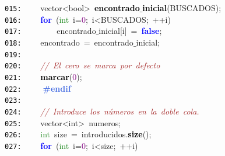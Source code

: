 \documentclass[a4paper,10pt]{scrartcl}
\begin{document}
{   \mbox{}\texttt{\textcolor{Black}{015:}} \ \ \ \ \textcolor{TealBlue}{vector\textless{}bool\textgreater{}}\ \textbf{\textcolor{Black}{encontrado$\_$inicial}}\textcolor{BrickRed}{(}BUSCADOS\textcolor{BrickRed}{);} \\
   \mbox{}\texttt{\textcolor{Black}{016:}} \ \ \ \ \textbf{\textcolor{Blue}{for}}\ \textcolor{BrickRed}{(}\textcolor{ForestGreen}{int}\ i\textcolor{BrickRed}{=}\textcolor{Purple}{0}\textcolor{BrickRed}{;}\ i\textcolor{BrickRed}{\textless{}}BUSCADOS\textcolor{BrickRed}{;}\ \textcolor{BrickRed}{++}i\textcolor{BrickRed}{)} \\
   \mbox{}\texttt{\textcolor{Black}{017:}} \ \ \ \ \ \ \ \ encontrado$\_$inicial\textcolor{BrickRed}{[}i\textcolor{BrickRed}{]}\ \textcolor{BrickRed}{=}\ \textbf{\textcolor{Blue}{false}}\textcolor{BrickRed}{;} \\
   \mbox{}\texttt{\textcolor{Black}{018:}} \ \ \ \ encontrado\ \textcolor{BrickRed}{=}\ encontrado$\_$inicial\textcolor{BrickRed}{;} \\
   \mbox{}\texttt{\textcolor{Black}{019:}} \ \  \\
   \mbox{}\texttt{\textcolor{Black}{020:}} \ \ \ \ \textit{\textcolor{Brown}{//\ El\ cero\ se\ marca\ por\ defecto}} \\
   \mbox{}\texttt{\textcolor{Black}{021:}} \ \ \ \ \textbf{\textcolor{Black}{marcar}}\textcolor{BrickRed}{(}\textcolor{Purple}{0}\textcolor{BrickRed}{);} \\
   \mbox{}\texttt{\textcolor{Black}{022:}} \textbf{\textcolor{RoyalBlue}{\ \ \ \ \#endif}} \\
   \mbox{}\texttt{\textcolor{Black}{023:}} \ \  \\
   \mbox{}\texttt{\textcolor{Black}{024:}} \ \ \ \ \textit{\textcolor{Brown}{//\ Introduce\ los\ números\ en\ la\ doble\ cola.}} \\
   \mbox{}\texttt{\textcolor{Black}{025:}} \ \ \ \ \textcolor{TealBlue}{vector\textless{}int\textgreater{}}\ numeros\textcolor{BrickRed}{;} \\
   \mbox{}\texttt{\textcolor{Black}{026:}} \ \ \ \ \textcolor{ForestGreen}{int}\ size\ \textcolor{BrickRed}{=}\ introducidos\textcolor{BrickRed}{.}\textbf{\textcolor{Black}{size}}\textcolor{BrickRed}{();} \\
   \mbox{}\texttt{\textcolor{Black}{027:}} \ \ \ \ \textbf{\textcolor{Blue}{for}}\ \textcolor{BrickRed}{(}\textcolor{ForestGreen}{int}\ i\textcolor{BrickRed}{=}\textcolor{Purple}{0}\textcolor{BrickRed}{;}\ i\textcolor{BrickRed}{\textless{}}size\textcolor{BrickRed}{;}\ \textcolor{BrickRed}{++}i\textcolor{BrickRed}{)} \\
}
\end{document}
